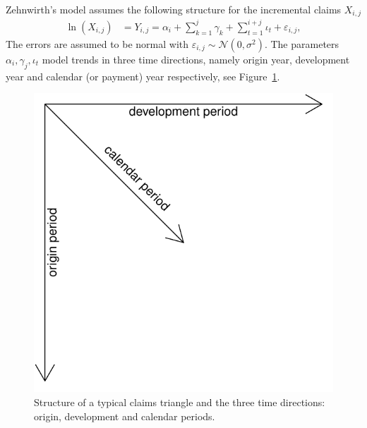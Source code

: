 \documentclass{article}
\begin{document}

Zehnwirth's model assumes the following structure for the incremental 
claims $X_{i,j}$
\begin{align} 
\ln(X_{i,j}) & = Y_{i,j} = \alpha_i + \sum_{k=1}^j\gamma_k + 
\sum_{t=1}^{i+j}\iota_t + \varepsilon_{i,j},\label{Zehnwirth} 
\end{align}
The errors are assumed to be normal with $\varepsilon_{i,j} \sim 
\mathcal{N}(0, \sigma^2)$. 
The parameters $\alpha_i, \gamma_j, \iota_t$ model trends in 
three time directions, namely origin year, development year and 
calendar (or payment) year respectively, see Figure~\ref{fig:triangleStructure}. 

\begin{figure}[thb]
\begin{center}
\includegraphics{Log-incremental-trianglestructure}
\caption{Structure of a typical claims triangle and the three time directions: 
origin, development and calendar periods.}
\label{fig:triangleStructure}
\end{center}
\end{figure}
\end{document}
